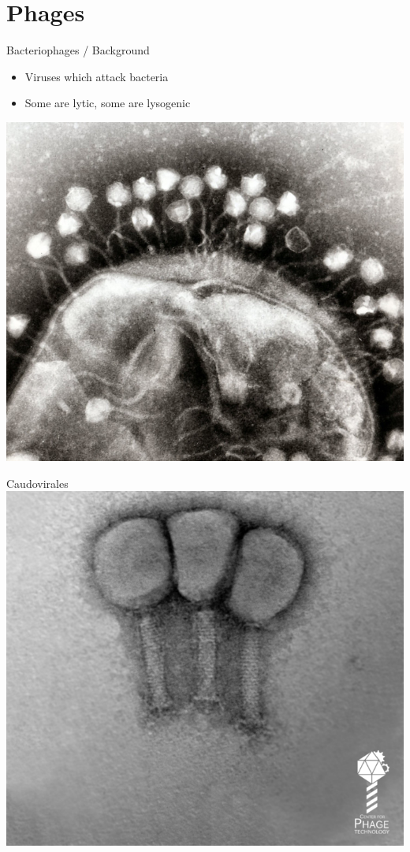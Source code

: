 \documentclass[12pt]{beamer}
\begin{document}
\section{Phages}
\begin{frame}{Bacteriophages / Background}
    \begin{itemize}
        \item Viruses which attack bacteria
        \item Some are lytic, some are lysogenic
    \end{itemize}
    \centering
    \includegraphics[]{./phage-attack.jpg}
\end{frame}
\begin{frame}{Caudovirales}
    \includegraphics[height=\textheight]{./triplets.png}
\end{frame}
\end{document}
